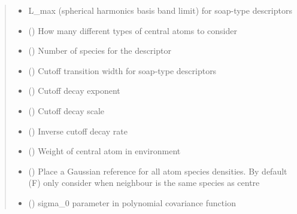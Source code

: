 \documentclass[letterpaper,10pt,english]{sphinxmanual}
\begin{document}
\begin{fulllineitems}
\begin{fulllineitems}
\begin{quote}
\begin{description}
\begin{itemize}
\item {} 
 \textendash{} L\_max (spherical harmonics basis band limit) for soap-type descriptors

\item {} 
 () \textendash{} How many different types of central atoms to consider

\item {} 
 () \textendash{} Number of species for the descriptor

\item {} 
 () \textendash{} Cutoff transition width for soap-type descriptors

\item {} 
 () \textendash{} Cutoff decay exponent

\item {} 
 () \textendash{} Cutoff decay scale

\item {} 
 () \textendash{} Inverse cutoff decay rate

\item {} 
 () \textendash{} Weight of central atom in environment

\item {} 
 () \textendash{} Place a Gaussian reference for all atom species densities. By default (F) only consider when neighbour is the same species as centre

\item {} 
 () \textendash{} sigma\_0 parameter in polynomial covariance function


\end{itemize}
\end{description}
\end{quote}
\end{fulllineitems}
\end{fulllineitems}
\end{document}
